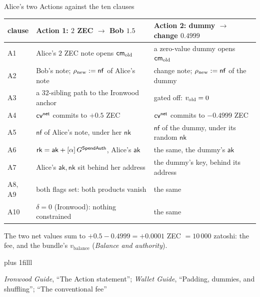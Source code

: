 \documentclass[aspectratio=169,11pt]{beamer}
\newcommand{\nfsym}{\ensuremath{\mathsf{nf}}}
\newcommand{\cmsym}{\ensuremath{\mathsf{cm}}}
\newcommand{\rksym}{\ensuremath{\mathsf{rk}}}
\newcommand{\aksym}{\ensuremath{\mathsf{ak}}}
\newcommand{\nksym}{\ensuremath{\mathsf{nk}}}
\newcommand{\src}[1]{\par\vskip0pt plus 1filll
  {\fontsize{6}{7.2}\selectfont\color{arbdim}\raggedright #1\par}}
\begin{document}
\begin{frame}{Alice's two Actions against the ten clauses}
\begin{center}\small
\begin{tabular}{@{}lp{6.1cm}p{6.1cm}@{}}
\toprule
clause & Action 1: $2$ ZEC $\to$ Bob $1.5$ & Action 2: dummy $\to$
  change $0.4999$ \\
\midrule
A1 & Alice's $2$ ZEC note opens $\Eold{\cmsym}$ & a zero-value dummy
  opens $\Eold{\cmsym}$ \\
A2 & Bob's note; $\Enew{\rho} := \nfsym$ of Alice's note & change note;
  $\Enew{\rho} := \nfsym$ of the dummy \\
A3 & a $32$-sibling path to the Ironwood anchor & gated off:
  $v_{\mathrm{old}} = 0$ \\
A4 & $\mathsf{cv}^{\mathsf{net}}$ commits to $+0.5$ ZEC & $\mathsf{cv}^{\mathsf{net}}$ commits to $-0.4999$ ZEC \\
A5 & $\nfsym$ of Alice's note, under her $\nksym$ & $\nfsym$ of the
  dummy, under its random $\nksym$ \\
A6 & $\rksym = \aksym + [\alpha]\,\Egsa$, Alice's $\aksym$ & the same,
  the dummy's $\aksym$ \\
A7 & Alice's $\aksym, \nksym$ sit behind her address & the dummy's
  key, behind its address \\
A8, A9 & both flags set: both products vanish & the same \\
A10 & $\delta = 0$ (Ironwood): nothing constrained & the same \\
\bottomrule
\end{tabular}
\end{center}
\smallskip
\small The two net values sum to $+0.5 - 0.4999 = +0.0001$ ZEC $=
10\,000$ zatoshi: the fee, and the bundle's $v_{\mathrm{balance}}$
(\emph{Balance and authority}).
\src{\emph{Ironwood Guide}, ``The Action statement''; \emph{Wallet
Guide}, ``Padding, dummies, and shuffling''; ``The conventional fee''}
\end{frame}
\end{document}
